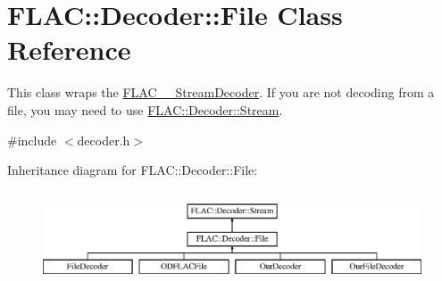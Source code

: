 \hypertarget{class_f_l_a_c_1_1_decoder_1_1_file}{}\section{F\+L\+AC\+:\+:Decoder\+:\+:File Class Reference}
\label{class_f_l_a_c_1_1_decoder_1_1_file}


This class wraps the \hyperlink{struct_f_l_a_c_____stream_decoder}{F\+L\+A\+C\+\_\+\+\_\+\+Stream\+Decoder}. If you are not decoding from a file, you may need to use \hyperlink{class_f_l_a_c_1_1_decoder_1_1_stream}{F\+L\+A\+C\+::\+Decoder\+::\+Stream}.  




{\ttfamily \#include $<$decoder.\+h$>$}

Inheritance diagram for F\+L\+AC\+:\+:Decoder\+:\+:File\+:\begin{figure}[H]
\begin{center}
\leavevmode
\includegraphics[height=2.745098cm]{class_f_l_a_c_1_1_decoder_1_1_file}
\end{center}
\end{figure}

